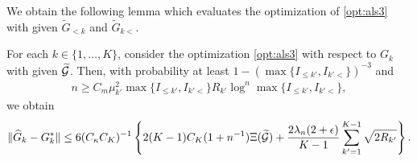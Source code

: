 We obtain the following lemma which evaluates the optimization of \eqref{opt:als3} with given $\tilde{G}_{<k}$ and $\tilde{G}_{k<}$.
\begin{lemma} \label{lem:als_1}
	For each $k \in \{1,\ldots,K\}$, consider the optimization \eqref{opt:als3} with respect to $G_k$ with given $\widetilde{\mathcal{G}}$.
	Then, with probability at least $1-( \max\{I_{\leq k'}, I_{k'<}\})^{-3}$ and 
	\begin{align*}
		n \geq C_{m} \mu_{k'}^2  \max\{I_{\leq k'}, I_{k'<}\} R_{k'} \log^n  \max\{I_{\leq k'}, I_{k'<}\},
	\end{align*}
	we obtain
	\begin{align*}
			\|\widehat{G}_k - G_k^*\| \leq 6 (C_{\kappa} C_K)^{-1} \left\{ 2(K-1)C_K(1+n^{-1})  \Xi(\widetilde{\mathcal{G}})  +   \frac{2 \lambda_n (2 + \epsilon) }{K-1}\sum_{k'=1}^{K-1} \sqrt{2R_{k'}}\right\}.
	\end{align*}
\end{lemma}
